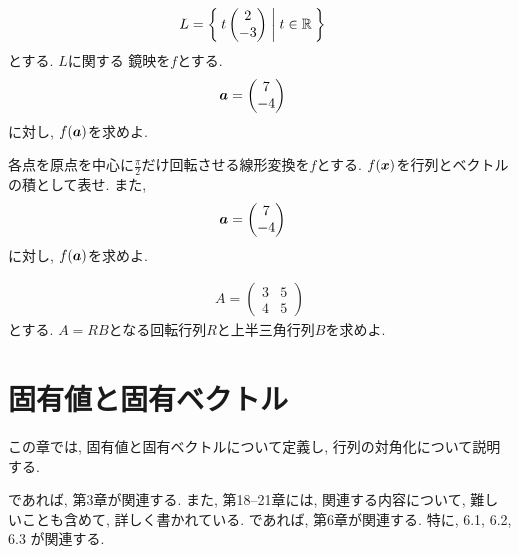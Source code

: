 \begin{quiz}
  \label{quiz:5:p:4}
  \begin{align*}
    L&=\Set{t\begin{pmatrix}2\\-3\end{pmatrix}|t\in\mathbb{R}}
  \end{align*}
  とする.
  $L$に関する
  鏡映を$f$とする.
  \begin{align*}
    \boldsymbol{a}&=\begin{pmatrix}7\\-4\end{pmatrix}
  \end{align*}
  に対し,
  $f(\boldsymbol{a})$を求めよ.
\end{quiz}

\begin{quiz} 
  各点を原点を中心に$\frac{\pi}{2}$だけ回転させる線形変換を$f$とする.
  $f(\boldsymbol{x})$を行列とベクトルの積として表せ.
  また, 
  \begin{align*}
    \boldsymbol{a}&=\begin{pmatrix}7\\-4\end{pmatrix}
  \end{align*}
  に対し,
  $f(\boldsymbol{a})$を求めよ.
\end{quiz}

\begin{quiz}
  \begin{align*}
    A=\begin{pmatrix}3&5\\4&5\end{pmatrix}
  \end{align*}
  とする.
  $A=RB$となる回転行列$R$と上半三角行列$B$を求めよ.
\end{quiz}



\chapter{固有値と固有ベクトル}
\label{chap:eigen}

この章では, 固有値と固有ベクトルについて定義し,
行列の対角化について説明する.

\cite{978-4-7806-0772-7}であれば,
第3章が関連する.
また, 第18--21章には,
関連する内容について, 難しいことも含めて, 詳しく書かれている.
\cite{978-4-7806-0164-0}であれば,
第6章が関連する.
特に, 6.1, 6.2, 6.3 が関連する.

